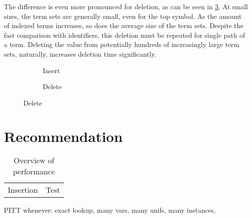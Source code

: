 The difference is even more pronounced for deletion, as can be seen in \cref{delete}. At small sizes, the term sets are generally small, even for the top symbol. As the amount of indexed terms increases, so does the average size of the term sets. Despite the fast comparison with identifiers, this deletion must be repeated for single path of a term. Deleting the value from potentially hundreds of increasingly large term sets, naturally, increases deletion time significantly.

\begin{figure}[h]
  \begin{subfigure}{0.45\textwidth}
\begin{adjustbox}{width=1\textwidth}
\end{adjustbox}
\caption{Insert}
\label{insert}
\end{subfigure}
\begin{subfigure}{0.1\textwidth}
\end{subfigure}
\begin{subfigure}{0.45\textwidth}
\begin{adjustbox}{width=1\textwidth}
\end{adjustbox}
\caption{Delete}
\label{delete}
\end{subfigure}
\end{figure}

\section{Recommendation}
\begin{table}
  \centering
\begin{tabular} { c c }
  Insertion & Test \\
\end{tabular}
\caption{Overview of performance}
\end{table}
PITT whenever: exact lookup, many vars, many unifs, many instances,

